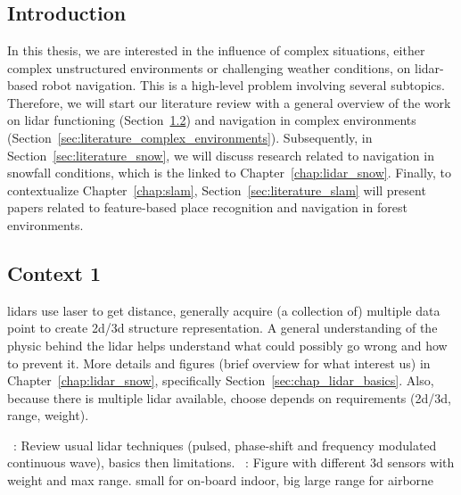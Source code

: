 \chapter{\chapzerotitle}
\label{chap:literature_review}


\section{Introduction}
In this thesis, we are interested in the influence of complex situations, either complex unstructured environments or challenging weather conditions, on \gls*{lidar}-based robot navigation. This is a high-level problem involving several subtopics. Therefore, we will start our literature review with a general overview of the work on \gls*{lidar} functioning (Section~\ref{sec:literature_lidar_functionning}) and navigation in complex environments (Section~\ref{sec:literature_complex_environments}).  Subsequently, in Section~\ref{sec:literature_snow}, we will discuss research related to navigation in snowfall conditions, which is the linked to Chapter~\ref{chap:lidar_snow}. Finally, to contextualize Chapter~\ref{chap:slam}, Section~\ref{sec:literature_slam} will present papers related to feature-based place recognition and navigation in forest environments. 


\section{Context 1}
\label{sec:literature_lidar_functionning}

\gls*{lidar}s use laser to get distance, generally acquire (a collection of) multiple data point to create 2d/3d structure representation.
A general understanding of the physic behind the lidar helps understand what could possibly go wrong and how to prevent it.
More details and figures (brief overview for what interest us) in Chapter~\ref{chap:lidar_snow}, specifically Section~\ref{sec:chap_lidar_basics}.
Also, because there is multiple lidar available, choose depends on requirements (2d/3d, range, weight).


~\cite{Bosch2001}:
Review usual lidar techniques (pulsed, phase-shift and frequency modulated continuous wave), basics then limitations.
~\cite{Pomerleau2015a}:
Figure with different 3d sensors with weight and max range. small for on-board indoor, big large range for airborne


